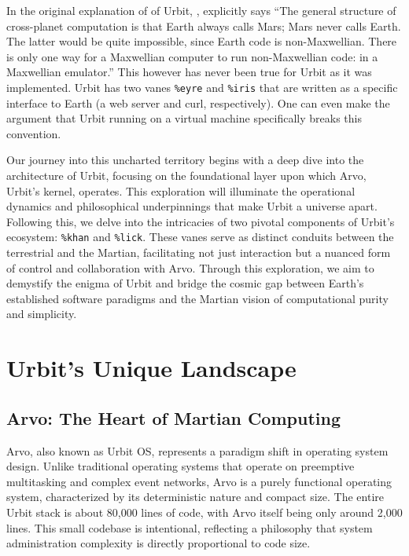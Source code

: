 \documentclass[twoside]{article}
\begin{document}
In the original explanation of of Urbit, \citeauthor{Yarvin2010}, explicitly says ``The general structure of cross-planet computation is that Earth always calls Mars; Mars never calls Earth. The latter would be quite impossible, since Earth code is non-Maxwellian. There is only one way for a Maxwellian computer to run non-Maxwellian code: in a Maxwellian emulator.'' This however has never been true for Urbit as it was implemented. Urbit has two vanes \texttt{\%eyre} and \texttt{\%iris} that are written as a specific interface to Earth (a web server and curl, respectively). One can even make the argument that Urbit running on a virtual machine specifically breaks this convention. 

Our journey into this uncharted territory begins with a deep dive into the architecture of Urbit, focusing on the foundational layer upon which Arvo, Urbit's kernel, operates.
This exploration will illuminate the operational dynamics and philosophical underpinnings that make Urbit a universe apart. 
Following this, we delve into the intricacies of two pivotal components of Urbit’s ecosystem: 
\texttt{\%khan} and \texttt{\%lick}. 
These vanes serve as distinct conduits between the terrestrial and the Martian, facilitating not just interaction but a nuanced form of control and collaboration with Arvo.
Through this exploration, we aim to demystify the enigma of Urbit and bridge the cosmic gap between Earth’s established software paradigms and the Martian vision of computational purity and simplicity.

\section{Urbit's Unique Landscape}

\subsection{Arvo: The Heart of Martian Computing}
Arvo, also known as Urbit OS, represents a paradigm shift in operating system design. Unlike traditional operating systems that operate on preemptive multitasking and complex event networks, Arvo is a purely functional operating system, characterized by its deterministic nature and compact size. The entire Urbit stack is about 80,000 lines of code, with Arvo itself being only around 2,000 lines. This small codebase is intentional, reflecting a philosophy that system administration complexity is directly proportional to code size.
\end{document}
